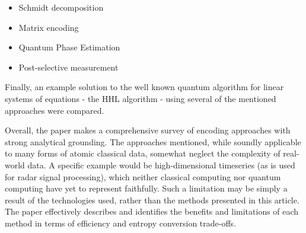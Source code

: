 \begin{itemize}
    \item Schmidt decomposition
    \item Matrix encoding
    \item Quantum Phase Estimation
    \item Post-selective measurement
\end{itemize}

Finally, an example solution to the well known quantum algorithm for linear systems of equations - the HHL algorithm - using several of the mentioned approaches were compared.

Overall, the paper makes a comprehensive survey of encoding approaches with strong analytical grounding. The approaches mentioned, while soundly applicable to many forms of atomic classical data, somewhat neglect the complexity of real-world data. A specific example would be high-dimensional timeseries (as is used for radar signal processing), which neither classical computing nor quantum computing have yet to represent faithfully. Such a limitation may be simply a result of the technologies used, rather than the methods presented in this article. The paper effectively describes and identifies the benefits and limitations of each method in terms of efficiency and entropy conversion trade-offs.




